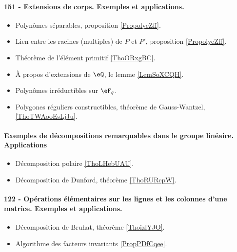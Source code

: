 \paragraph{151 - Extensions de corps. Exemples et applications.}
\begin{itemize}
    \item Polynômes séparables, proposition \ref{PropolyeZff}.
    \item Lien entre les racines (multiples) de \( P\) et \( P'\), proposition \ref{PropolyeZff}.
    \item Théorème de l'élément primitif \ref{ThoORxgBC}.
    \item À propos d'extensions de \( \eQ\), le lemme \ref{LemSoXCQH}.
    \item Polynômes irréductibles sur \( \eF_q\).
    \item Polygones réguliers constructibles, théorème de Gauss-Wantzel, \ref{ThoTWAooEsLjJu}.
\end{itemize}
\paragraph{Exemples de décompositions remarquables dans le groupe linéaire. Applications}
\begin{itemize}
    \item Décomposition polaire \ref{ThoLHebUAU}.
    \item Décomposition de Dunford, théorème \ref{ThoRURcpW}. 
\end{itemize}

\paragraph{122 - Opérations élémentaires sur les lignes et les colonnes d’une matrice. Exemples et applications.}
\begin{itemize}
    \item Décomposition de Bruhat, théorème \ref{ThoizlYJO}.
    \item Algorithme des facteurs invariants \ref{PropPDfCqee}.
\end{itemize}

